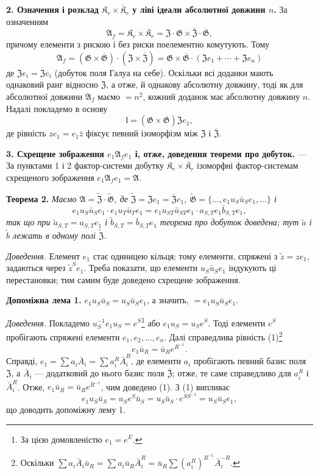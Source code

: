 \documentclass[11pt]{article}
\newcommand{\srcfn}[2]{\footnote{#2}}
\begin{document}
\noindent\textbf{2. Означення і розклад \(\mathfrak K_r\times\overline{\mathfrak K}_r\) у ліві ідеали абсолютної довжини \(n\).} За означенням
\[
\mathfrak A_f=\mathfrak K_r\times\overline{\mathfrak K}_r
=\mathfrak Z\cdot\mathfrak G\times\overline{\mathfrak Z}\cdot\overline{\mathfrak G},
\]
причому елементи з рискою і без риски поелементно комутують. Тому
\[
\mathfrak A_f
=(\mathfrak G\times\overline{\mathfrak G})\cdot(\mathfrak Z\times\overline{\mathfrak Z})
=\mathfrak G\times\overline{\mathfrak G}\cdot(\mathfrak Ze_1+\cdots+\mathfrak Ze_n)
\]
де \(\mathfrak Ze_i=\overline{\mathfrak Z}e_i\) (добуток поля Галуа на себе). Оскільки всі доданки мають однаковий ранг відносно \(\mathfrak Z\), а отже, й однакову абсолютну довжину, тоді як для абсолютної довжини \(\mathfrak A_f\) маємо \(=n^2\), кожний доданок має абсолютну довжину \(n\). Надалі покладемо в основу
\[
\mathfrak l=(\mathfrak G\times\overline{\mathfrak G})\mathfrak Ze_1,
\]
де рівність \(ze_1=e_1\bar z\) фіксує певний ізоморфізм між \(\mathfrak Z\) і \(\overline{\mathfrak Z}\).

\noindent\textbf{3. Схрещене зображення \(e_1\mathfrak A_fe_1\) і, отже, доведення теореми про добуток.} --- За пунктами 1 і 2 фактор-системи добутку \(\mathfrak K_r\times\overline{\mathfrak K}_r\) ізоморфні фактор-системам схрещеного зображення \(e_1\mathfrak A_fe_1=\mathfrak A\).

\noindent\textbf{Теорема 2.} \emph{Маємо \(\mathfrak A=\widetilde{\mathfrak Z}\cdot\widetilde{\mathfrak G}\), де \(\widetilde{\mathfrak Z}=\mathfrak Ze_1=\overline{\mathfrak Z}e_1\), \(\widetilde{\mathfrak G}=\{\ldots,e_1u_S\bar u_Se_1,\ldots\}\) і
\[
e_1u_S\bar u_Se_1\cdot e_1u_T\bar u_Te_1
=e_1u_{ST}\bar u_{ST}e_1\cdot a_{S,T}e_1\bar b_{S,T}e_1,
\]
так що при \(\tilde a_{S,T}=a_{S,T}e_1\) і \(\tilde b_{S,T}=\bar b_{S,T}e_1\) теорема про добуток доведена; тут \(\tilde a\) і \(\tilde b\) лежать в одному полі \(\widetilde{\mathfrak Z}\).}

\noindent\emph{Доведення.} Елемент \(e_1\) стає одиницею кільця; тому елементи, спряжені з \(\tilde z=ze_1\), задаються через \(\tilde z^Se_1\). Треба показати, що елементи \(u_S\bar u_Se_1\) індукують ці перестановки; тим самим буде доведено схрещене зображення.

\noindent\textbf{Допоміжна лема 1.} \(e_1u_S\bar u_S=u_S\bar u_Se_1\), а значить, \(=e_1u_S\bar u_Se_1\).

\noindent\emph{Доведення.} Покладемо \(u_S^{-1}e_1u_S=e^S\)\srcfn{1}{За цією домовленістю \(e_1=e^E\).} або \(e_1u_S=u_Se^S\). Тоді елементи \(e^S\) пробігають спряжені елементи \(e_1,e_2,\ldots,e_n\). Далі справедлива рівність (1)\srcfn{2}{Оскільки \(\sum a_i\bar A_i\bar u_R=\sum a_i\bar u_R\bar A_i^R=\bar u_R\sum(a_i^R)^{R^{-1}}\bar A_i^{-R}\).}
\[
e_1\bar u_R=\bar u_Re^{R^{-1}}.
\]
Справді, \(e_1=\sum a_i\bar A_i=\sum a_i^R\bar A_i^R\), де елементи \(a_i\) пробігають певний базис поля \(\mathfrak Z\), а \(\bar A_i\) --- додатковий до нього базис поля \(\overline{\mathfrak Z}\); отже, те саме справедливо для \(a_i^R\) і \(\bar A_i^R\). Отже, \(e_1\bar u_R=\bar u_Re^{R^{-1}}\), чим доведено (1). З (1) випливає
\[
e_1u_S\bar u_S=u_Se^S\bar u_S=u_S\bar u_S\cdot e^{SS^{-1}}=u_S\bar u_Se_1,
\]
що доводить допоміжну лему 1.
\end{document}
